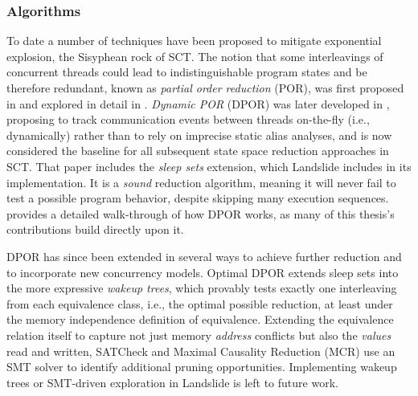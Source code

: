 
\subsubsection{Algorithms}

To date a number of techniques have been proposed to mitigate exponential explosion,
the Sisyphean rock of SCT.
The notion that some interleavings of concurrent threads could lead to indistinguishable program states and be therefore redundant,
known as {\em partial order reduction} (POR),
was first proposed in \cite{partial-model-checking}
and explored in detail in \cite{partial-order-methods}.
{\em Dynamic POR} (DPOR) was later developed in \cite{dpor},
proposing to track communication events between threads on-the-fly (i.e., dynamically)
rather than to rely on imprecise static alias analyses,
and is now considered the baseline for all subsequent state space reduction approaches in SCT.
That paper includes the {\em sleep sets} extension,
which Landslide includes in its implementation.
It is a {\em sound} reduction algorithm, meaning it will never fail to test a possible program behavior, despite skipping many execution sequences.
\sect{\ref{sec:landslide-dpor}} provides a detailed walk-through of how DPOR works,
as many of this thesis's contributions build directly upon it.

DPOR has since been extended in several ways to achieve further reduction
and to incorporate new concurrency models.
Optimal DPOR \cite{optimal-dpor} extends sleep sets into the more expressive {\em wakeup trees},
which provably tests exactly one interleaving from each equivalence class,
i.e., the optimal possible reduction,
at least under the memory independence definition of equivalence.
Extending the equivalence relation itself to capture not just memory {\em address} conflicts
but also the {\em values} read and written,
SATCheck \cite{satcheck} and Maximal Causality Reduction (MCR) \cite{mcr}
use an SMT solver \cite{z3} to identify additional pruning opportunities.
Implementing wakeup trees or SMT-driven exploration in Landslide is left to future work.

